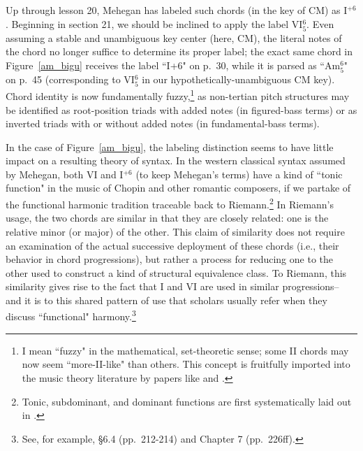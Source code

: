 Up through lesson 20, Mehegan has labeled such chords (in the key of CM) as I$^{+6}$.  Beginning in section 21, we should be inclined to apply the label VI$^6_5$.  Even assuming a stable and unambiguous key center (here, CM), the literal notes of the chord no longer suffice to determine its proper label; the exact same chord in Figure~\ref{am_bigu} receives the label ``I+6" on p.\ 30, while it is parsed as ``Am$^6_5$" on p.\ 45 (corresponding to VI$^6_5$ in our hypothetically-unambiguous CM key).  Chord identity is now fundamentally fuzzy,\footnote{I mean ``fuzzy" in the mathematical, set-theoretic sense; some II chords may now seem ``more-II-like" than others.  This concept is fruitfully imported into the music theory literature by papers like \cite{quinn1997} and \cite{quinn2001}.} as non-tertian pitch structures may be identified as root-position triads with added notes (in figured-bass terms) or as inverted triads with or without added notes (in fundamental-bass terms).

In the case of Figure~\ref{am_bigu}, the labeling distinction seems to have little impact on a resulting theory of syntax.  In the western classical syntax assumed by Mehegan, both VI and I$^{+6}$ (to keep Mehegan's terms) have a kind of ``tonic function" in the music of Chopin and other romantic composers, if we partake of the functional harmonic tradition traceable back to Riemann.\footnote{Tonic, subdominant, and dominant functions are first systematically laid out in \cite{riemann1893}.}  In Riemann's usage, the two chords are similar in that they are closely related: one is the relative minor (or major) of the other.  This claim of similarity does not require an examination of the actual successive deployment of these chords (i.e., their behavior in chord progressions), but rather a process for reducing one to the other used to construct a kind of structural equivalence class.  To Riemann, this similarity gives rise to the fact that I and VI are used in similar progressions-- and it is to this shared pattern of use that scholars usually refer when they discuss ``functional" harmony.\footnote{See, for example, \cite{tymoczko2010} \S 6.4 (pp.\ 212-214) and Chapter 7 (pp.\ 226ff).}  

